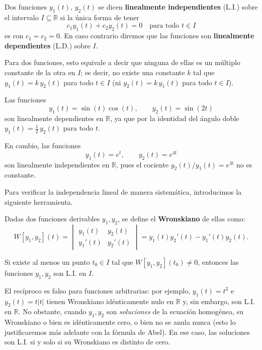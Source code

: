 \begin{definition}
    Dos funciones $y_1(t),\,y_2(t)$ se dicen \textbf{linealmente independientes} (L.I.) sobre el intervalo $I\subseteq \mathbb{R}$ si la \'unica forma de tener
    \[
    c_1y_1(t)+c_2y_2(t)=0\quad\text{para todo } t\in I
    \]
    es con $c_1=c_2=0$. En caso contrario diremos que las funciones son \textbf{linealmente dependientes} (L.D.) sobre $I$.

    Para dos funciones, esto equivale a decir que ninguna de ellas es un m\'ultiplo constante de la otra en $I$; es decir, no existe una constante $k$ tal que $y_1(t)=k\,y_2(t)$ para todo $t\in I$ (ni $y_2(t)=k\,y_1(t)$ para todo $t\in I$).
\end{definition}

\begin{example}
    Las funciones
    \[
    y_1(t)=\sin(t)\cos(t),\qquad y_2(t)=\sin(2t)
    \]
    son linealmente dependientes en $\mathbb{R}$, ya que por la identidad del \'angulo doble $y_1(t)=\tfrac{1}{2}\,y_2(t)$ para todo $t$.

    En cambio, las funciones
    \[
    y_1(t)=e^{t},\qquad y_2(t)=e^{4t}
    \]
    son linealmente independientes en $\mathbb{R}$, pues el cociente $y_2(t)/y_1(t)=e^{3t}$ no es constante.
\end{example}

Para verificar la independencia lineal de manera sistem\'atica, introducimos la siguiente herramienta.

\begin{definition}
    Dadas dos funciones derivables $y_1,y_2$, se define el \textbf{Wronskiano} de ellas como:
    \[
    W[y_1,y_2](t)=\begin{vmatrix}
        y_1(t) & y_2(t)\\
        y_1'(t) & y_2'(t)
    \end{vmatrix}=y_1(t)y_2'(t)-y_1'(t)y_2(t).
    \]
\end{definition}

\begin{remark}
    Si existe al menos un punto $t_0\in I$ tal que $W[y_1,y_2](t_0)\neq 0$, entonces las funciones $y_1,y_2$ son L.I. en $I$.

    El rec\'iproco es falso para funciones arbitrarias: por ejemplo, $y_1(t)=t^2$ e $y_2(t)=t|t|$ tienen Wronskiano id\'enticamente nulo en $\mathbb{R}$ y, sin embargo, son L.I. en $\mathbb{R}$. No obstante, cuando $y_1,y_2$ son \emph{soluciones} de la ecuaci\'on homog\'enea, su Wronskiano o bien es id\'enticamente cero, o bien no se anula nunca (esto lo justificaremos m\'as adelante con la f\'ormula de Abel). En ese caso, las soluciones son L.I. si y solo si su Wronskiano es distinto de cero.
\end{remark}

